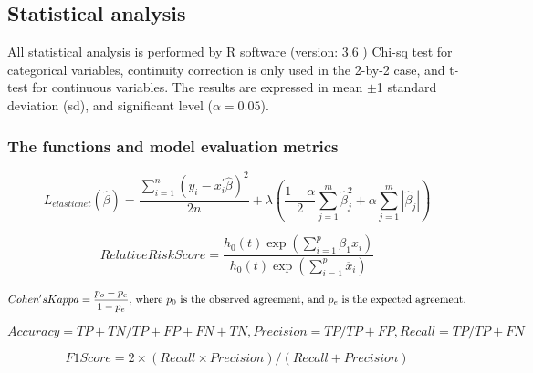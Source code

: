 \documentclass[fleqn,10pt]{wlscirep}
\begin{document}
\subsection*{Statistical analysis  }
All statistical analysis is performed by R software (version: 3.6 ) Chi-sq test for categorical variables, continuity correction is only used in the 2-by-2 case, and t-test for continuous variables. The results are expressed in mean $\pm$1 standard deviation (sd), and significant level ($\alpha=0.05$).

\subsubsection*{The functions and model evaluation metrics}
\begin{equation}\label{Elasticnet}
L_{elasticnet}(\hat{\beta})=\frac{\sum_{i=1}^{n}\left(y_{i}-x_{i}^{\prime} \hat{\beta}\right)^{2}}{2 n}+\lambda\left(\frac{1-\alpha}{2} \sum_{j=1}^{m} \hat{\beta}_{j}^{2}+\alpha \sum_{j=1}^{m}\left|\hat{\beta}_{j}\right|\right)
\end{equation}

\begin{equation} \label{risk}
Relative Risk Score = \frac{h_{0}(t) \exp \left(\sum_{i=1}^{p} \beta_{1} x_{i}\right)}{h_{0}(t) \exp \left(\sum_{i=1}^{p}\overline{x}_{i}\right)}
\end{equation}

\begin{equation} \label{kappa}
 Cohen's Kappa = \frac{p_{o}-p_{e}}{1-p_{e}} $, where ${p{_0}}$ is the observed agreement, and ${p{_e}}$ is the expected agreement.$
 \end{equation}

\begin{equation} \label{apr}
Accuracy =TP+TN/TP+FP+FN+TN, Precision = TP/TP+FP, Recall = TP/TP+FN
\end{equation}

\begin{equation} \label{F1}
F1 Score = 2\times(Recall\times Precision)/(Recall + Precision)
\end{equation}
\end{document}
